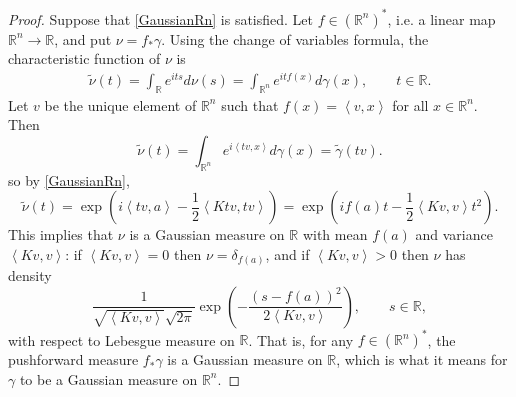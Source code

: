 \documentclass{article}
\newcommand{\inner}[2]{\left\langle #1, #2 \right\rangle}
\theoremstyle{definition}
\theoremstyle{definition}
\begin{document}
\begin{proof}
Suppose  that
\eqref{GaussianRn} is satisfied.
Let $f \in (\mathbb{R}^n)^*$, i.e. a linear map $\mathbb{R}^n \to \mathbb{R}$, and put $\nu = f_* \gamma$. Using the change of variables formula,
the characteristic function of $\nu$ is
\begin{align*}
\widetilde{\nu}(t) = \int_{\mathbb{R}} e^{it s} d\nu(s) = 
\int_{\mathbb{R}^n} e^{it f(x)} d\gamma(x), \qquad t \in \mathbb{R}.
\end{align*}
Let $v$ be the unique element of $\mathbb{R}^n$ such that
$f(x) = \inner{v}{x}$ for all $x \in \mathbb{R}^n$. Then
\[
\widetilde{\nu}(t) = \int_{\mathbb{R}^n} e^{i \inner{tv}{x}} d\gamma(x) = 
\widetilde{\gamma}(tv).
\]
so by  \eqref{GaussianRn},
\[
\widetilde{\nu}(t) = \exp\left( i \inner{tv}{a} - \frac{1}{2} \inner{Ktv}{tv} \right)
=\exp\left(i f(a) t  - \frac{1}{2}  \inner{Kv}{v} t^2 \right).
\]
This implies that $\nu$ is a Gaussian measure on $\mathbb{R}$ with mean $f(a)$ and variance
$\inner{Kv}{v}$: if $\inner{Kv}{v}=0$ then 
$\nu=\delta_{f(a)}$, and if $\inner{Kv}{v}>0$ then $\nu$ has density
\[
\frac{1}{\sqrt{\inner{Kv}{v}} \sqrt{2\pi}} \exp\left(-\frac{(s-f(a))^2}{2 \inner{Kv}{v}} \right), \qquad
s \in \mathbb{R},
\]
with respect to Lebesgue measure on $\mathbb{R}$. That is, for any
$f \in (\mathbb{R}^n)^*$, the pushforward measure $f_* \gamma$ is a Gaussian measure
on $\mathbb{R}$, which is what it means for $\gamma$ to be a Gaussian measure on $\mathbb{R}^n$. 


\end{proof}
\end{document}
